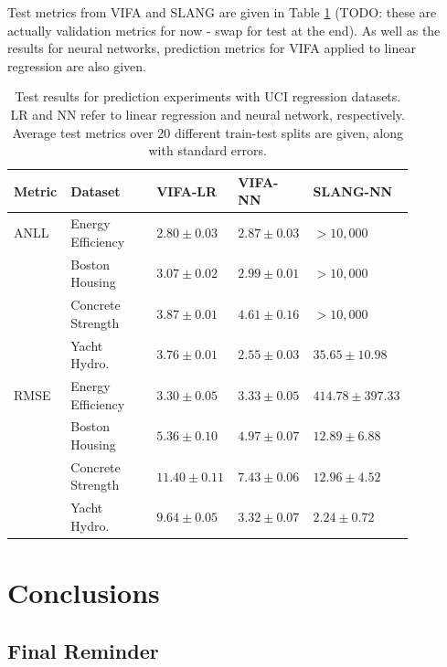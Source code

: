 \documentclass[msc,deptreport.inf]{infthesis} %
\begin{document}
Test metrics from VIFA and SLANG are given in Table \ref{table:neural_nets_uci} (TODO: these are actually validation metrics for now - swap for test at the end). As well as the results for neural networks, prediction metrics for VIFA applied to linear regression are also given. 

\begin{table}[h!]
	\begin{center}
		\begin{tabular}{|| p{0.13\linewidth} p{0.21\linewidth} p{0.15\linewidth} p{0.15\linewidth} p{0.23\linewidth} ||} 
 			\hline
 			Metric & Dataset & VIFA-LR & VIFA-NN & SLANG-NN \\ [0.5ex] 
 			\hline\hline
			ANLL 	& Energy Efficiency 	& $\mathbf{2.80 \pm 0.03}$  	& $2.87 \pm 0.03$ 			& $>10,000$ \\ 
					& Boston Housing 	& $3.07 \pm 0.02$ 			& $\mathbf{2.99 \pm 0.01}$ 	& $>10,000$ \\ 
					& Concrete Strength & $\mathbf{3.87 \pm 0.01}$ 	& $4.61 \pm 0.16$ 			& $>10,000$ \\ 
 					& Yacht Hydro. 		& $3.76 \pm 0.01$ 			& $\mathbf{2.55 \pm 0.03}$ 	& $35.65 \pm 10.98$ \\
 			\hline
			RMSE 	& Energy Efficiency 	& $\mathbf{3.30 \pm 0.05}$  	& $\mathbf{3.33 \pm 0.05}$ 	& $414.78 \pm 397.33$ \\ 
					& Boston Housing 	& $5.36 \pm 0.10$ 			& $\mathbf{4.97 \pm 0.07}$ 	& $12.89 \pm 6.88$ \\ 
					& Concrete Strength & $11.40 \pm 0.11$ 			& $\mathbf{7.43 \pm 0.06}$ 	& $12.96 \pm 4.52$ \\ 
 					& Yacht Hydro. 		& $9.64 \pm 0.05$ 			& $3.32 \pm 0.07$ 			& $\mathbf{2.24 \pm 0.72}$ 
					\\ [1ex] 
			\hline
		\end{tabular}
		\caption{Test results for prediction experiments with UCI regression datasets. LR and NN refer to linear regression and neural network, respectively. Average test metrics over 20 different train-test splits are given, along with standard errors.}
		\label{table:neural_nets_uci}
	\end{center}
\end{table}



\chapter{Conclusions}

\section{Final Reminder}
\end{document}
